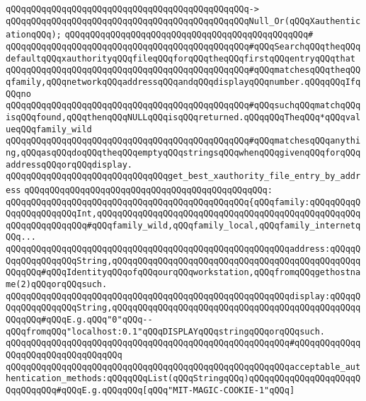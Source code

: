 \verb|qQQqqQQqqQQqqQQqqQQqqQQqqQQqqQQqqQQqqQQqqQQqqQQq->|\newline
\verb|qQQqqQQqqQQqqQQqqQQqqQQqqQQqqQQqqQQqqQQqqQQqqQQqNull_Or(qQQqXauthenticationqQQq);|\newline
\verb|qQQqqQQqqQQqqQQqqQQqqQQqqQQqqQQqqQQqqQQqqQQqqQQq#|\newline
\verb|qQQqqQQqqQQqqQQqqQQqqQQqqQQqqQQqqQQqqQQqqQQqqQQq#qQQqSearchqQQqtheqQQqdefaultqQQqxauthorityqQQqfileqQQqforqQQqtheqQQqfirstqQQqentryqQQqthat|\newline
\verb|qQQqqQQqqQQqqQQqqQQqqQQqqQQqqQQqqQQqqQQqqQQqqQQq#qQQqmatchesqQQqtheqQQqfamily,qQQqnetworkqQQqaddressqQQqandqQQqdisplayqQQqnumber.qQQqqQQqIfqQQqno|\newline
\verb|qQQqqQQqqQQqqQQqqQQqqQQqqQQqqQQqqQQqqQQqqQQqqQQq#qQQqsuchqQQqmatchqQQqisqQQqfound,qQQqthenqQQqNULLqQQqisqQQqreturned.qQQqqQQqTheqQQq*qQQqvalueqQQqfamily_wild|\newline
\verb|qQQqqQQqqQQqqQQqqQQqqQQqqQQqqQQqqQQqqQQqqQQqqQQq#qQQqmatchesqQQqanything,qQQqasqQQqdoqQQqtheqQQqemptyqQQqstringsqQQqwhenqQQqgivenqQQqforqQQqaddressqQQqorqQQqdisplay.|\newline
\newline
\newline
\verb|qQQqqQQqqQQqqQQqqQQqqQQqqQQqqQQqget_best_xauthority_file_entry_by_address|\newline
\verb|qQQqqQQqqQQqqQQqqQQqqQQqqQQqqQQqqQQqqQQqqQQqqQQq:|\newline
\verb|qQQqqQQqqQQqqQQqqQQqqQQqqQQqqQQqqQQqqQQqqQQqqQQq{qQQqfamily:qQQqqQQqqQQqqQQqqQQqqQQqInt,qQQqqQQqqQQqqQQqqQQqqQQqqQQqqQQqqQQqqQQqqQQqqQQqqQQqqQQqqQQqqQQqqQQq#qQQqfamily_wild,qQQqfamily_local,qQQqfamily_internetqQQq...|\newline
\verb|qQQqqQQqqQQqqQQqqQQqqQQqqQQqqQQqqQQqqQQqqQQqqQQqqQQqqQQqaddress:qQQqqQQqqQQqqQQqqQQqString,qQQqqQQqqQQqqQQqqQQqqQQqqQQqqQQqqQQqqQQqqQQqqQQqqQQqqQQq#qQQqIdentityqQQqofqQQqourqQQqworkstation,qQQqfromqQQqgethostname(2)qQQqorqQQqsuch.|\newline
\verb|qQQqqQQqqQQqqQQqqQQqqQQqqQQqqQQqqQQqqQQqqQQqqQQqqQQqqQQqdisplay:qQQqqQQqqQQqqQQqqQQqString,qQQqqQQqqQQqqQQqqQQqqQQqqQQqqQQqqQQqqQQqqQQqqQQqqQQqqQQq#qQQqE.g.qQQq"0"qQQq--qQQqfromqQQq"localhost:0.1"qQQqDISPLAYqQQqstringqQQqorqQQqsuch.|\newline
\verb|qQQqqQQqqQQqqQQqqQQqqQQqqQQqqQQqqQQqqQQqqQQqqQQqqQQqqQQq#qQQqqQQqqQQqqQQqqQQqqQQqqQQqqQQqqQQq|\newline
\verb|qQQqqQQqqQQqqQQqqQQqqQQqqQQqqQQqqQQqqQQqqQQqqQQqqQQqqQQqacceptable_authentication_methods:qQQqqQQqList(qQQqStringqQQq)qQQqqQQqqQQqqQQqqQQqqQQqqQQqqQQq#qQQqE.g.qQQqqQQq[qQQq"MIT-MAGIC-COOKIE-1"qQQq]|\newline
